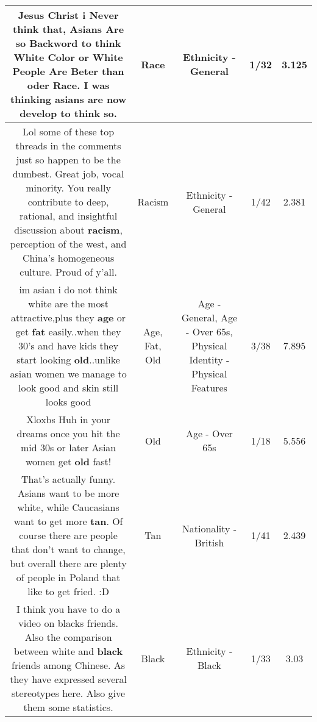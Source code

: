 \documentclass[11pt]{article}
\newlength\mylength
\begin{document}
\begin{center}
\begin{longtable}{|C{.65\mylength}|C{.30\mylength}|C{.12\mylength}|C{.12\mylength}|C{.12\mylength}|}
  \small Jesus Christ i Never think that, Asians Are so Backword to think White Color or White People Are Beter than oder \textbf{Race}. I was thinking asians are now develop to think so.\normalsize   & Race & Ethnicity - General & 1/32 & 3.125 \\  \hline
  \small Lol some of these top threads in the comments just so happen to be the dumbest. Great job, vocal minority. You really contribute to deep, rational, and insightful discussion about \textbf{racism}, perception of the west, and China's homogeneous culture. Proud of y'all.\normalsize   & Racism & Ethnicity - General & 1/42 & 2.381 \\  \hline
  \small im asian i do not think white are the most attractive,plus they \textbf{age} or get \textbf{fat} easily..when they 30's and have kids they start looking \textbf{old}..unlike asian women we manage to look good and skin still looks good\normalsize   & Age, Fat, Old & Age - General, Age - Over 65s, Physical Identity - Physical Features & 3/38 & 7.895 \\  \hline
  \small Xloxbs Huh in your dreams once you hit the mid 30s or later Asian women get \textbf{old} fast!\normalsize   & Old & Age - Over 65s & 1/18 & 5.556 \\  \hline
  \small That's actually funny. Asians want to be more white, while Caucasians want to get more \textbf{tan}. Of course there are people that don't want to change, but overall there are plenty of people in Poland that like to get fried. :D\normalsize   & Tan & Nationality - British & 1/41 & 2.439 \\  \hline
  \small I think you have to do a video on blacks friends. Also the comparison between white and \textbf{black} friends among Chinese. As they have expressed several stereotypes here.  Also give them some statistics.\normalsize   & Black & Ethnicity - Black & 1/33 & 3.03 \\  \hline

\end{longtable}
\end{center}
\end{document}
